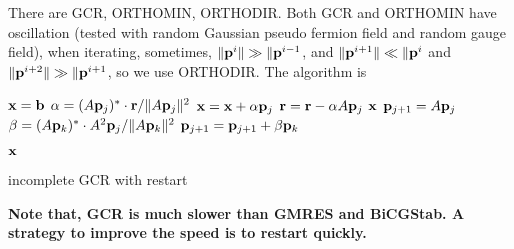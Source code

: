 There are GCR, ORTHOMIN, ORTHODIR. Both GCR and ORTHOMIN have oscillation (tested with random Gaussian pseudo fermion field and random gauge field), when iterating, sometimes, $\|{\bf p}^{i}\|\gg \|{\bf p}^{i-1}$, and $\|{\bf p}^{i+1}\|\ll \|{\bf p}^{i}$ and $\|{\bf p}^{i+2}\|\gg \|{\bf p}^{i+1}$, so we use ORTHODIR. The algorithm is
\begin{algorithm}[H]
\begin{algorithmic}
\State ${\bf x}={\bf b}$
        \State $\alpha = (A{\bf p}_j)^*\cdot {\bf r} / \|A{\bf p}_j\|^2$
        \State ${\bf x}={\bf x}+\alpha {\bf p}_j$
        \State ${\bf r}={\bf r}-\alpha A{\bf p}_j$
            \Return $\bf x$
        \EndIf        
        \State ${\bf p}_{j+1}=A{\bf p}_j$
            \State $\beta = (A{\bf p}_k)^*\cdot A^2{\bf p}_j / \|A{\bf p}_k\|^2$
            \State ${\bf p}_{j+1}={\bf p}_{j+1}+\beta {\bf p}_k$
        \EndFor
    \EndFor
\EndFor

\Return $\bf x$
\end{algorithmic}
\caption{incomplete GCR with restart}
\end{algorithm}

\textbf{Note that, GCR is much slower than GMRES and BiCGStab. A strategy to improve the speed is to restart quickly.}
